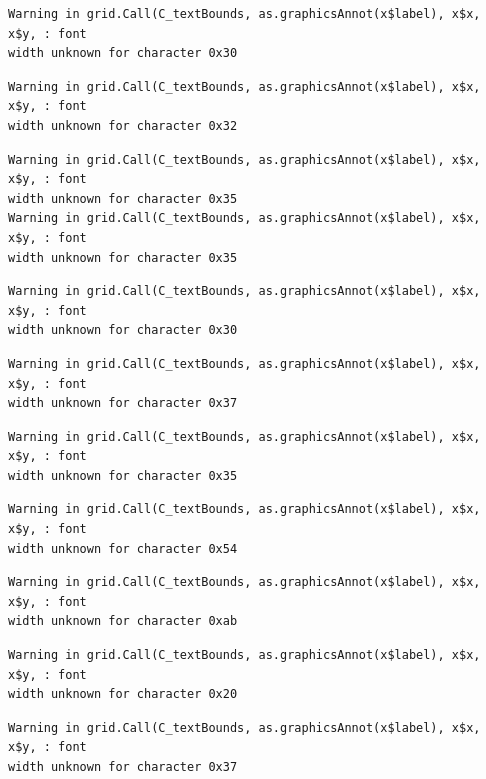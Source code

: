 \documentclass[
  letterpaper,
]{scrbook}
\begin{document}
\begin{verbatim}
Warning in grid.Call(C_textBounds, as.graphicsAnnot(x$label), x$x, x$y, : font
width unknown for character 0x30
\end{verbatim}

\begin{verbatim}
Warning in grid.Call(C_textBounds, as.graphicsAnnot(x$label), x$x, x$y, : font
width unknown for character 0x32
\end{verbatim}

\begin{verbatim}
Warning in grid.Call(C_textBounds, as.graphicsAnnot(x$label), x$x, x$y, : font
width unknown for character 0x35
Warning in grid.Call(C_textBounds, as.graphicsAnnot(x$label), x$x, x$y, : font
width unknown for character 0x35
\end{verbatim}

\begin{verbatim}
Warning in grid.Call(C_textBounds, as.graphicsAnnot(x$label), x$x, x$y, : font
width unknown for character 0x30
\end{verbatim}

\begin{verbatim}
Warning in grid.Call(C_textBounds, as.graphicsAnnot(x$label), x$x, x$y, : font
width unknown for character 0x37
\end{verbatim}

\begin{verbatim}
Warning in grid.Call(C_textBounds, as.graphicsAnnot(x$label), x$x, x$y, : font
width unknown for character 0x35
\end{verbatim}

\begin{verbatim}
Warning in grid.Call(C_textBounds, as.graphicsAnnot(x$label), x$x, x$y, : font
width unknown for character 0x54
\end{verbatim}

\begin{verbatim}
Warning in grid.Call(C_textBounds, as.graphicsAnnot(x$label), x$x, x$y, : font
width unknown for character 0xab
\end{verbatim}

\begin{verbatim}
Warning in grid.Call(C_textBounds, as.graphicsAnnot(x$label), x$x, x$y, : font
width unknown for character 0x20
\end{verbatim}

\begin{verbatim}
Warning in grid.Call(C_textBounds, as.graphicsAnnot(x$label), x$x, x$y, : font
width unknown for character 0x37
\end{verbatim}
\end{document}
